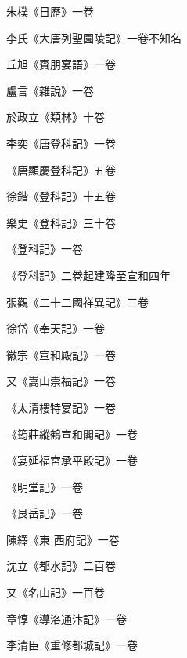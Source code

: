 \begin{pinyinscope}
 朱樸《日歷》一卷



 李氏《大唐列聖園陵記》一卷不知名



 丘旭《賓朋宴語》一卷



 盧言《雜說》一卷



 於政立《類林》十卷



 李奕《唐登科記》一卷



 《唐顯慶登科記》五卷



 徐鍇《登科記》十五卷



 樂史《登科記》三十卷



 《登科記》一卷



 《登科記》二卷起建隆至宣和四年



 張觀《二十二國祥異記》三卷



 徐岱《奉天記》一卷



 徽宗《宣和殿記》一卷



 又《嵩山崇福記》一卷



 《太清樓特宴記》一卷



 《筠莊縱鶴宣和閣記》一卷



 《宴延福宮承平殿記》一卷



 《明堂記》一卷



 《艮岳記》一卷



 陳繹《東
 西府記》一卷



 沈立《都水記》二百卷



 又《名山記》一百卷



 章惇《導洛通汴記》一卷



 李清臣《重修都城記》一卷




\end{pinyinscope}
